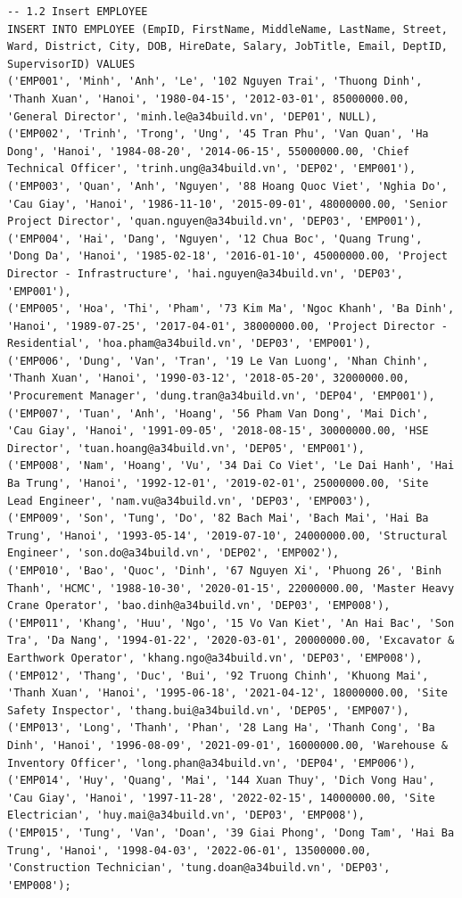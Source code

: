 \documentclass[a4paper,12pt]{report}
\begin{document}
\begin{lstlisting}
-- 1.2 Insert EMPLOYEE
INSERT INTO EMPLOYEE (EmpID, FirstName, MiddleName, LastName, Street, Ward, District, City, DOB, HireDate, Salary, JobTitle, Email, DeptID, SupervisorID) VALUES
('EMP001', 'Minh', 'Anh', 'Le', '102 Nguyen Trai', 'Thuong Dinh', 'Thanh Xuan', 'Hanoi', '1980-04-15', '2012-03-01', 85000000.00, 'General Director', 'minh.le@a34build.vn', 'DEP01', NULL),
('EMP002', 'Trinh', 'Trong', 'Ung', '45 Tran Phu', 'Van Quan', 'Ha Dong', 'Hanoi', '1984-08-20', '2014-06-15', 55000000.00, 'Chief Technical Officer', 'trinh.ung@a34build.vn', 'DEP02', 'EMP001'),
('EMP003', 'Quan', 'Anh', 'Nguyen', '88 Hoang Quoc Viet', 'Nghia Do', 'Cau Giay', 'Hanoi', '1986-11-10', '2015-09-01', 48000000.00, 'Senior Project Director', 'quan.nguyen@a34build.vn', 'DEP03', 'EMP001'),
('EMP004', 'Hai', 'Dang', 'Nguyen', '12 Chua Boc', 'Quang Trung', 'Dong Da', 'Hanoi', '1985-02-18', '2016-01-10', 45000000.00, 'Project Director - Infrastructure', 'hai.nguyen@a34build.vn', 'DEP03', 'EMP001'),
('EMP005', 'Hoa', 'Thi', 'Pham', '73 Kim Ma', 'Ngoc Khanh', 'Ba Dinh', 'Hanoi', '1989-07-25', '2017-04-01', 38000000.00, 'Project Director - Residential', 'hoa.pham@a34build.vn', 'DEP03', 'EMP001'),
('EMP006', 'Dung', 'Van', 'Tran', '19 Le Van Luong', 'Nhan Chinh', 'Thanh Xuan', 'Hanoi', '1990-03-12', '2018-05-20', 32000000.00, 'Procurement Manager', 'dung.tran@a34build.vn', 'DEP04', 'EMP001'),
('EMP007', 'Tuan', 'Anh', 'Hoang', '56 Pham Van Dong', 'Mai Dich', 'Cau Giay', 'Hanoi', '1991-09-05', '2018-08-15', 30000000.00, 'HSE Director', 'tuan.hoang@a34build.vn', 'DEP05', 'EMP001'),
('EMP008', 'Nam', 'Hoang', 'Vu', '34 Dai Co Viet', 'Le Dai Hanh', 'Hai Ba Trung', 'Hanoi', '1992-12-01', '2019-02-01', 25000000.00, 'Site Lead Engineer', 'nam.vu@a34build.vn', 'DEP03', 'EMP003'),
('EMP009', 'Son', 'Tung', 'Do', '82 Bach Mai', 'Bach Mai', 'Hai Ba Trung', 'Hanoi', '1993-05-14', '2019-07-10', 24000000.00, 'Structural Engineer', 'son.do@a34build.vn', 'DEP02', 'EMP002'),
('EMP010', 'Bao', 'Quoc', 'Dinh', '67 Nguyen Xi', 'Phuong 26', 'Binh Thanh', 'HCMC', '1988-10-30', '2020-01-15', 22000000.00, 'Master Heavy Crane Operator', 'bao.dinh@a34build.vn', 'DEP03', 'EMP008'),
('EMP011', 'Khang', 'Huu', 'Ngo', '15 Vo Van Kiet', 'An Hai Bac', 'Son Tra', 'Da Nang', '1994-01-22', '2020-03-01', 20000000.00, 'Excavator & Earthwork Operator', 'khang.ngo@a34build.vn', 'DEP03', 'EMP008'),
('EMP012', 'Thang', 'Duc', 'Bui', '92 Truong Chinh', 'Khuong Mai', 'Thanh Xuan', 'Hanoi', '1995-06-18', '2021-04-12', 18000000.00, 'Site Safety Inspector', 'thang.bui@a34build.vn', 'DEP05', 'EMP007'),
('EMP013', 'Long', 'Thanh', 'Phan', '28 Lang Ha', 'Thanh Cong', 'Ba Dinh', 'Hanoi', '1996-08-09', '2021-09-01', 16000000.00, 'Warehouse & Inventory Officer', 'long.phan@a34build.vn', 'DEP04', 'EMP006'),
('EMP014', 'Huy', 'Quang', 'Mai', '144 Xuan Thuy', 'Dich Vong Hau', 'Cau Giay', 'Hanoi', '1997-11-28', '2022-02-15', 14000000.00, 'Site Electrician', 'huy.mai@a34build.vn', 'DEP03', 'EMP008'),
('EMP015', 'Tung', 'Van', 'Doan', '39 Giai Phong', 'Dong Tam', 'Hai Ba Trung', 'Hanoi', '1998-04-03', '2022-06-01', 13500000.00, 'Construction Technician', 'tung.doan@a34build.vn', 'DEP03', 'EMP008');


\end{lstlisting}
\end{document}
